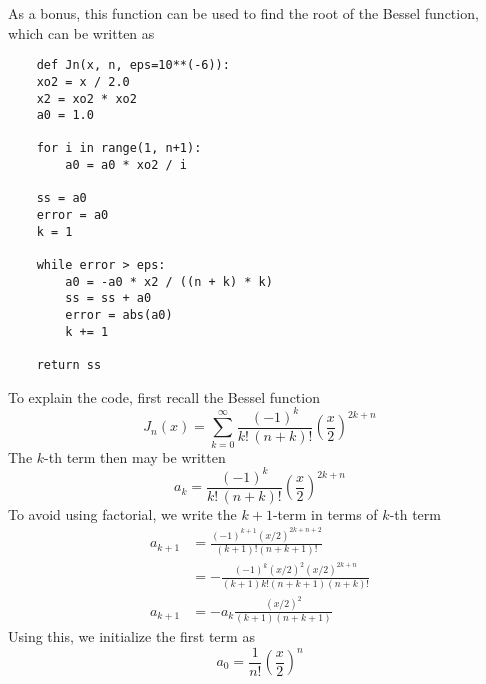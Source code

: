 \documentclass[../../../main.tex]{subfiles}
\begin{document}
As a bonus, this function can be used to find the root of the Bessel function, which can be written as 
\begin{verbatim}
    def Jn(x, n, eps=10**(-6)):
    xo2 = x / 2.0
    x2 = xo2 * xo2
    a0 = 1.0

    for i in range(1, n+1):
        a0 = a0 * xo2 / i
    
    ss = a0
    error = a0
    k = 1
    
    while error > eps:
        a0 = -a0 * x2 / ((n + k) * k)
        ss = ss + a0
        error = abs(a0)
        k += 1
    
    return ss
\end{verbatim}
To explain the code, first recall the Bessel function
\begin{equation*}
J_n(x) = \sum_{k=0}^{\infty} \frac{(-1)^k}{k! \, (n+k)!} \left( \frac{x}{2} \right)^{2k+n}
\end{equation*}
The $k$-th term then may be written 
\begin{equation*}
    a_k = \frac{(-1)^k}{k! \, (n+k)!} \left( \frac{x}{2} \right)^{2k+n}
\end{equation*}
To avoid using factorial, we write the $k+1$-term in terms of $k$-th term
\begin{align*}
    a_{k+1} &= \frac{(-1)^{k+1}(x/2)^{2k+n+2}}{(k+1)!(n+k+1)!}\\
    &= -\frac{(-1)^k(x/2)^2(x/2)^{2k+n }}{(k+1)k!(n+k+1)(n+k)!}\\
    a_{k+1}&= -a_k\frac{(x/2)^2}{(k+1)(n+k+1)}
\end{align*}
Using this, we initialize the first term as 
\begin{equation*}
    a_0=\frac{1 }{n!}\left( \frac{x }{2 } \right) ^n
\end{equation*}
\end{document}
